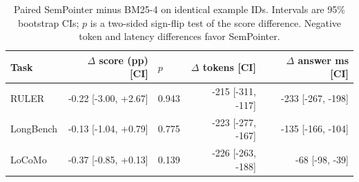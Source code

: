 \begin{table}[t]
\centering
\scriptsize
\setlength{\tabcolsep}{3pt}
\caption{Paired SemPointer minus BM25-4 on identical example IDs. Intervals are 95\% bootstrap CIs; $p$ is a two-sided sign-flip test of the score difference. Negative token and latency differences favor SemPointer.}
\label{tab:paired}
\begin{tabular}{lrlrr}
\toprule
Task & $\Delta$ score (pp) [CI] & $p$ & $\Delta$ tokens [CI] & $\Delta$ answer ms [CI] \\
\midrule
RULER & -0.22 [-3.00, +2.67] & 0.943 & -215 [-311, -117] & -233 [-267, -198] \\
LongBench & -0.13 [-1.04, +0.79] & 0.775 & -223 [-277, -167] & -135 [-166, -104] \\
LoCoMo & -0.37 [-0.85, +0.13] & 0.139 & -226 [-263, -188] & -68 [-98, -39] \\
\bottomrule
\end{tabular}
\end{table}

